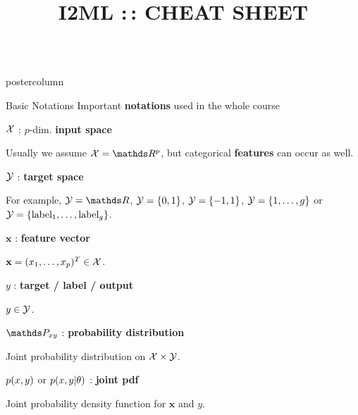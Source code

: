 \documentclass{beamer}
\title{I2ML :\,: CHEAT SHEET} %
\newlength{\columnheight} %
\begin{document}
\begin{frame}[fragile]{}
\begin{columns}
	\begin{column}{.31\textwidth}
		\begin{beamercolorbox}[center]{postercolumn}
			\begin{minipage}{.98\textwidth}
				\parbox[t][\columnheight]{\textwidth}{				
					\begin{myblock}{Basic Notations}
						Important \textbf{notations} used in the whole course  
						\\
						\begin{codebox}
						    $\mathcal{X}$ : $p$-dim. 
						    \textbf{input space} %
						\end{codebox}
						\hspace*{1ex}Usually we assume $\Xspace = \R^p$, but categorical \textbf{features} can occur as \hspace*{1ex}well.
				    
						\begin{codebox}
							$\mathcal{Y}$ : \textbf{target space}
						\end{codebox}
						\hspace*{1ex}For example, $\Yspace = \R$, $\mathcal{Y} = \lbrace 0, 1 \rbrace$, $\mathcal{Y} = \lbrace -1, 1 \rbrace$, $\mathcal{Y} = \{1, \ldots, g\}$ or \hspace*{1ex}$\mathcal{Y} = \lbrace \textrm{label}_1, \ldots , \textrm{label}_g \rbrace$.
				
						\begin{codebox}
							$\mathbf{x}$ : \textbf{feature vector}
						\end{codebox}
						\hspace*{1ex}$\mathbf{x} = (x_1, \ldots, x_p)^T \in \mathcal{X}$.
						
						\begin{codebox}
							$y$ : \textbf{target / label / output}
						\end{codebox}
						\hspace*{1ex}$y \in \mathcal{Y}$.
						
						\begin{codebox}
							 $\P_{xy}$ : \textbf{probability distribution}
						\end{codebox}
						\hspace*{1ex}Joint probability distribution on $\mathcal{X} \times \mathcal{Y}$.
						
						\begin{codebox}
							$p(x,y)$ or $p(x, y | \theta)$ : \textbf{joint pdf}
						\end{codebox}
						\hspace*{1ex}Joint probability density function for $\mathbf{x}$ and $y$.\\
						

\end{myblock}}
\end{minipage}
\end{beamercolorbox}
\end{column}
\end{columns}
\end{frame}
\end{document}
